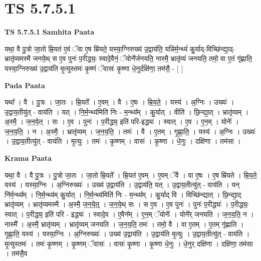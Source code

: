 \documentclass[17pt]{extarticle}
\begin{document}
\section{ TS 5.7.5.1 }

\textbf{TS 5.7.5.1 } \newline
\textbf{Samhita Paata} \newline

यथा॒ वै पु॒त्रो जा॒तो म्रि॒यत॑ ए॒वं ॅवा ए॒ष म्रि॑यते॒ यस्या॒ग्निरुख्य॑ उ॒द्वाय॑ति॒ यन्नि॑र्म॒न्थ्यं॑ कु॒र्याद्-विच्छि॑न्द्या॒द्-भ्रातृ॑व्यमस्मै जनये॒थ् स ए॒व पुनः॑ प॒रीद्ध्यः॒ स्वादे॒वैनं॒ ॅयोने᳚र्जनयति॒ नास्मै॒ भ्रातृ॑व्यं जनयति॒ तमो॒ वा ए॒तं गृ॑ह्णाति॒ यस्या॒ग्निरुख्य॑ उ॒द्वाय॑ति मृ॒त्युस्तमः॑ कृ॒ष्णं ॅवासः॑ कृ॒ष्णा धे॒नुर्दक्षि॑णा॒ तम॑सै॒ - [  ] \newline

\textbf{Pada Paata} \newline

यथा᳚ । वै । पु॒त्रः । जा॒तः । म्रि॒यते᳚ । ए॒वम् । वै । ए॒षः । म्रि॒य॒ते॒ । यस्य॑ । अ॒ग्निः । उख्यः॑ । उ॒द्वाय॒तीयु॑त् - वाय॑ति । यत् । नि॒र्म॒न्थ्य॑मिति॑ निः - म॒न्थ्य᳚म् । कु॒र्यात् । वीति॑ । छि॒न्द्या॒त् । भ्रातृ॑व्यम् । अ॒स्मै॒ । ज॒न॒ये॒त् । सः । ए॒व । पुनः॑ । प॒रीद्ध्य॒ इति॑ परि-इद्ध्यः॑ । स्वात् । ए॒व । ए॒न॒म् । योनेः᳚ । ज॒न॒य॒ति॒ । न । अ॒स्मै॒ । भ्रातृ॑व्यम् । ज॒न॒य॒ति॒ । तमः॑ । वै । ए॒तम् । गृ॒ह्णा॒ति॒ । यस्य॑ । अ॒ग्निः । उख्यः॑ । उ॒द्वाय॒तीत्यु॑त् - वाय॑ति । मृ॒त्युः । तमः॑ । कृ॒ष्णम् । वासः॑ । कृ॒ष्णा । धे॒नुः । दक्षि॑णा । तम॑सा ।  \newline


\textbf{Krama Paata} \newline

यथा॒ वै । वै पु॒त्रः । पु॒त्रो जा॒तः । जा॒तो म्रि॒यते᳚ । म्रि॒यत॑ ए॒वम् । ए॒वम् ॅवै । वा ए॒षः । ए॒ष म्रि॑यते । म्रि॒य॒ते॒ यस्य॑ । यस्या॒ग्निः । अ॒ग्निरुख्यः॑ । उख्य॑ उ॒द्वाय॑ति । उ॒द्वाय॑ति॒ यत् । उ॒द्वाय॒तीत्यु॑त् - वाय॑ति । यन् नि॑र्म॒न्थ्य᳚म् । नि॒र्म॒न्थ्य॑म् कु॒र्यात् । नि॒र्म॒न्थ्य॑मिति॑ निः - म॒न्थ्य᳚म् । कु॒र्याद् वि । विच्छि॑न्द्यात् । छि॒न्द्या॒द् भ्रातृ॑व्यम् । भ्रातृ॑व्यमस्मै । अ॒स्मै॒ ज॒न॒ये॒त्॒ । ज॒न॒ये॒थ् सः । स ए॒व । ए॒व पुनः॑ । पुनः॑ प॒रीद्ध्यः॑ । प॒रीद्ध्यः॒ स्वात् । प॒रीद्ध्य॒ इति॑ परि - इद्ध्यः॑ । स्वादे॒व । ए॒वैन᳚म् । ए॒न॒म् ॅयोनेः᳚ । योने᳚र् जनयति । ज॒न॒य॒ति॒ न । नास्मै᳚ । अ॒स्मै॒ भ्रातृ॑व्यम् । भ्रातृ॑व्यम् जनयति । ज॒न॒य॒ति॒ तमः॑ । तमो॒ वै । वा ए॒तम् । ए॒तम् गृ॑ह्णाति । गृ॒ह्णा॒ति॒ यस्य॑ । यस्या॒ग्निः । अ॒ग्निरुख्यः॑ । उख्य॑ उ॒द्वाय॑ति । उ॒द्वाय॑ति मृ॒त्युः । उ॒द्वाय॒तीत्यु॑त् - वाय॑ति । मृ॒त्युस्तमः॑ । तमः॑ कृ॒ष्णम् । कृ॒ष्णम् ॅवासः॑ । वासः॑ कृ॒ष्णा । कृ॒ष्णा धे॒नुः । धे॒नुर् दक्षि॑णा । दक्षि॑णा॒ तम॑सा । तम॑सै॒व \newline
\end{document}
